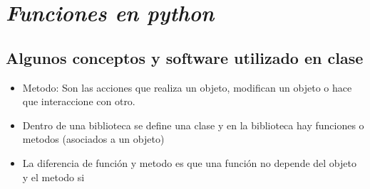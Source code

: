 \documentclass{book}
\begin{document}
\begin{itemize}
		
		
		
		
	\end{itemize}
	
	
	
	





\section{\textit{Funciones en python}}%
\begin{flushright}
	\date{16 de enero de 2019}
\end{flushright}

	\subsection{Algunos conceptos y software utilizado en clase}%
	\begin{itemize}
		\item Metodo: Son las acciones que realiza un objeto, modifican un objeto o hace que interaccione con otro.
		\item Dentro de una biblioteca se define una clase y en la biblioteca hay funciones o metodos (asociados a un objeto)	
		\item La diferencia de función y metodo es que una función no depende del objeto y el metodo si
		
	\end{itemize}
	
\end{document}
